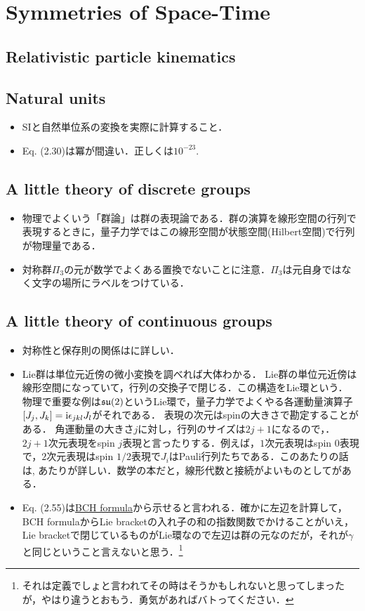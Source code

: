 \section{Symmetries of Space-Time}
\subsection{Relativistic particle kinematics}
\subsection{Natural units}
\begin{itemize}
		\item SIと自然単位系の変換を実際に計算すること．

		\item Eq. (2.30)は冪が間違い．正しくは$10^{-23} $.
\end{itemize}
\subsection{A little theory of discrete groups}
\begin{itemize}
		\item 物理でよくいう「群論」は群の表現論である．群の演算を線形空間の行列で表現するときに，量子力学ではこの線形空間が状態空間(Hilbert空間)で行列が物理量である．
		\item 対称群$\Pi_3 $の元が数学でよくある置換でないことに注意．$\Pi_3 $は元自身ではなく文字の場所にラベルをつけている．
\end{itemize}
\subsection{A little theory of continuous groups}
\begin{itemize}
		\item 対称性と保存則の関係は\cite[Chap.10, Sec.4]{BB17130464}に詳しい．
		\item Lie群は単位元近傍の微小変換を調べれば大体わかる．
				Lie群の単位元近傍は線形空間になっていて，行列の交換子で閉じる．この構造をLie環という．
				物理で重要な例は$\mathfrak{su}(2) $というLie環で，量子力学でよくやる各運動量演算子$[J_j, J_k] = \mathrm{i}\epsilon_{jkl}J_l $がそれである．
				表現の次元はspinの大きさで勘定することがある．
				角運動量の大きさ$j $に対し，行列のサイズは$2j + 1 $になるので，．$2j+1 $次元表現をspin $j $表現と言ったりする．例えば，$1 $次元表現はspin $0 $表現で，$2 $次元表現はspin $1/2 $表現で$J_i $はPauli行列たちである．このあたりの話は\cite[Chap.3]{BB03663366}, \cite{BN10398292}あたりが詳しい．数学の本だと，線形代数と接続がよいものとして\cite{BC13565134}がある．
		\item Eq. (2.55)は\href{https://en.wikipedia.org/wiki/Baker%E2%80%93Campbell%E2%80%93Hausdorff_formula}{BCH formula}から示せると言われる．確かに左辺を計算して，BCH formulaからLie bracketの入れ子の和の指数関数でかけることがいえ，Lie bracketで閉じているものがLie環なので左辺は群の元なのだが，それが$\gamma $と同じということ言えないと思う．\footnote{それは定義でしょと言われてその時はそうかもしれないと思ってしまったが，やはり違うとおもう．勇気があればバトってください．}
\end{itemize}
